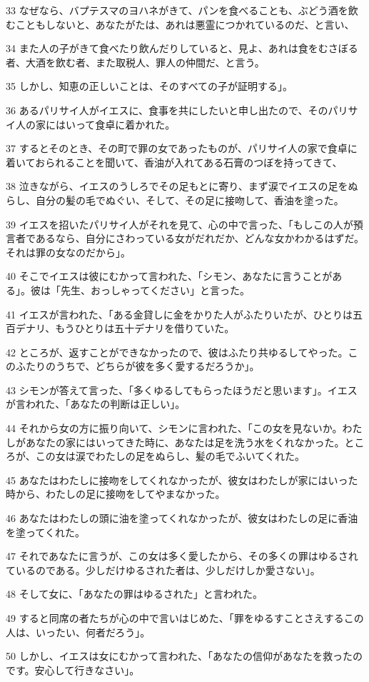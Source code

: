 \par 33 なぜなら、バプテスマのヨハネがきて、パンを食べることも、ぶどう酒を飲むこともしないと、あなたがたは、あれは悪霊につかれているのだ、と言い、
\par 34 また人の子がきて食べたり飲んだりしていると、見よ、あれは食をむさぼる者、大酒を飲む者、また取税人、罪人の仲間だ、と言う。
\par 35 しかし、知恵の正しいことは、そのすべての子が証明する」。
\par 36 あるパリサイ人がイエスに、食事を共にしたいと申し出たので、そのパリサイ人の家にはいって食卓に着かれた。
\par 37 するとそのとき、その町で罪の女であったものが、パリサイ人の家で食卓に着いておられることを聞いて、香油が入れてある石膏のつぼを持ってきて、
\par 38 泣きながら、イエスのうしろでその足もとに寄り、まず涙でイエスの足をぬらし、自分の髪の毛でぬぐい、そして、その足に接吻して、香油を塗った。
\par 39 イエスを招いたパリサイ人がそれを見て、心の中で言った、「もしこの人が預言者であるなら、自分にさわっている女がだれだか、どんな女かわかるはずだ。それは罪の女なのだから」。
\par 40 そこでイエスは彼にむかって言われた、「シモン、あなたに言うことがある」。彼は「先生、おっしゃってください」と言った。
\par 41 イエスが言われた、「ある金貸しに金をかりた人がふたりいたが、ひとりは五百デナリ、もうひとりは五十デナリを借りていた。
\par 42 ところが、返すことができなかったので、彼はふたり共ゆるしてやった。このふたりのうちで、どちらが彼を多く愛するだろうか」。
\par 43 シモンが答えて言った、「多くゆるしてもらったほうだと思います」。イエスが言われた、「あなたの判断は正しい」。
\par 44 それから女の方に振り向いて、シモンに言われた、「この女を見ないか。わたしがあなたの家にはいってきた時に、あなたは足を洗う水をくれなかった。ところが、この女は涙でわたしの足をぬらし、髪の毛でふいてくれた。
\par 45 あなたはわたしに接吻をしてくれなかったが、彼女はわたしが家にはいった時から、わたしの足に接吻をしてやまなかった。
\par 46 あなたはわたしの頭に油を塗ってくれなかったが、彼女はわたしの足に香油を塗ってくれた。
\par 47 それであなたに言うが、この女は多く愛したから、その多くの罪はゆるされているのである。少しだけゆるされた者は、少しだけしか愛さない」。
\par 48 そして女に、「あなたの罪はゆるされた」と言われた。
\par 49 すると同席の者たちが心の中で言いはじめた、「罪をゆるすことさえするこの人は、いったい、何者だろう」。
\par 50 しかし、イエスは女にむかって言われた、「あなたの信仰があなたを救ったのです。安心して行きなさい」。

